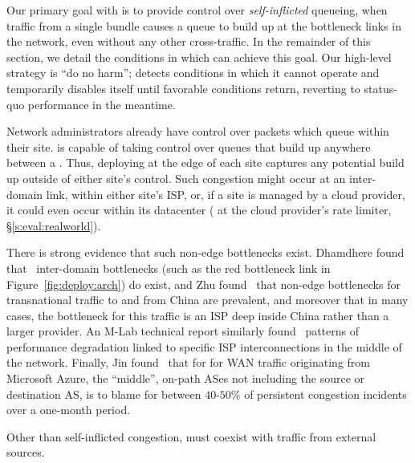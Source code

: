 Our primary goal with \name is to provide control over \emph{self-inflicted} queueing, \ie when traffic from a single bundle causes a queue to build up at the bottleneck links in the network, even without any other cross-traffic.
In the remainder of this section, we detail the conditions in which \name can achieve this goal. Our high-level strategy is ``do no harm''; \name detects conditions in which it cannot operate and temporarily disables itself until favorable conditions return, reverting to status-quo performance in the meantime.

Network administrators already have control over packets which queue within their site. \name is capable of taking control over queues that build up anywhere between a \pair. Thus, deploying \name at the edge of each site captures any potential build up outside of either site's control. Such congestion might occur at an inter-domain link, within either site's ISP, or, if a site is managed by a cloud provider, it could even occur within its datacenter (\eg{} at the cloud provider's rate limiter, \S\ref{s:eval:realworld}). 

There is strong evidence that such non-edge bottlenecks exist.
%
Dhamdhere \etal found that~\cite{inferring-interdomain-congestion} inter-domain bottlenecks (such as the red bottleneck link in Figure~\ref{fig:deploy:arch}) do exist, and
Zhu \etal found~\cite{bottleneck-of-china} that non-edge bottlenecks for transnational traffic to and from China are prevalent, and moreover that in many cases, the bottleneck for this traffic is an ISP deep inside China rather than a larger provider.
An M-Lab technical report similarly found~\cite{mlab-tr} patterns of performance degradation linked to specific ISP interconnections in the middle of the network.
Finally, Jin \etal found~\cite{blameit} that for for WAN traffic originating from Microsoft Azure, the ``middle'', \ie on-path ASes not including the source or destination AS, is to blame for between $40$-$50\%$ of persistent congestion incidents over a one-month period. 

 Other than self-inflicted congestion, \name must coexist with traffic from external sources.

